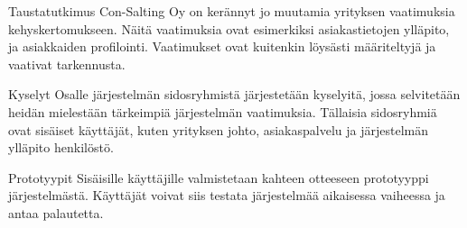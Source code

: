 Taustatutkimus 
Con-Salting Oy on kerännyt jo muutamia yrityksen vaatimuksia kehyskertomukseen. 
Näitä vaatimuksia ovat esimerkiksi asiakastietojen ylläpito, ja asiakkaiden profilointi.
Vaatimukset ovat kuitenkin löysästi määriteltyjä ja vaativat tarkennusta.

Kyselyt
Osalle järjestelmän sidosryhmistä järjestetään kyselyitä, jossa selvitetään heidän mielestään tärkeimpiä järjestelmän vaatimuksia.
Tällaisia sidosryhmiä ovat sisäiset käyttäjät, kuten yrityksen johto, asiakaspalvelu ja järjestelmän ylläpito henkilöstö.

Prototyypit
Sisäisille käyttäjille valmistetaan kahteen otteeseen prototyyppi järjestelmästä. Käyttäjät voivat siis testata järjestelmää aikaisessa vaiheessa ja antaa palautetta.